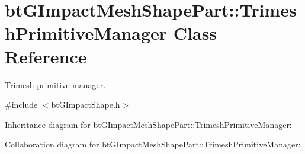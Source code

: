\hypertarget{classbt_g_impact_mesh_shape_part_1_1_trimesh_primitive_manager}{\section{bt\+G\+Impact\+Mesh\+Shape\+Part\+:\+:Trimesh\+Primitive\+Manager Class Reference}
\label{classbt_g_impact_mesh_shape_part_1_1_trimesh_primitive_manager}
}


Trimesh primitive manager.  




{\ttfamily \#include $<$bt\+G\+Impact\+Shape.\+h$>$}



Inheritance diagram for bt\+G\+Impact\+Mesh\+Shape\+Part\+:\+:Trimesh\+Primitive\+Manager\+:


Collaboration diagram for bt\+G\+Impact\+Mesh\+Shape\+Part\+:\+:Trimesh\+Primitive\+Manager\+:
